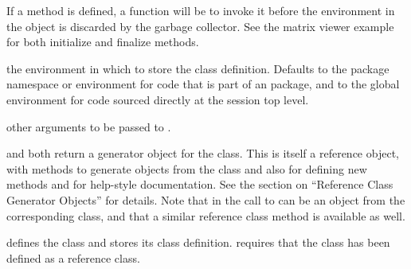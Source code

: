 \begin{Arguments}
\begin{ldescription}
If a  method is defined, a function will be
 to invoke it before the environment
in the object is discarded by the garbage collector. See the matrix
viewer example for both initialize and finalize methods.

\item[\code{where}] 
the environment in which to store the class definition.  Defaults to
the package namespace or environment for code that is part of an \R{}
package, and to the global environment for code sourced directly at
the session top level.

\item[\code{...}] 
other arguments to be passed to .

\end{ldescription}
\end{Arguments}
%
\begin{Value}
 and  both return a generator object for the class. This is
itself a reference object, with methods to generate objects from the
class and also for defining new methods and for help-style
documentation. See the
section on ``Reference Class Generator Objects'' for details.
Note that  in the call to  can be an
object from the corresponding class, and that a similar reference
class method  
is available as well.

 defines the class and stores its class definition.
 requires that the class has been defined as a
reference class.

\end{Value}
%
